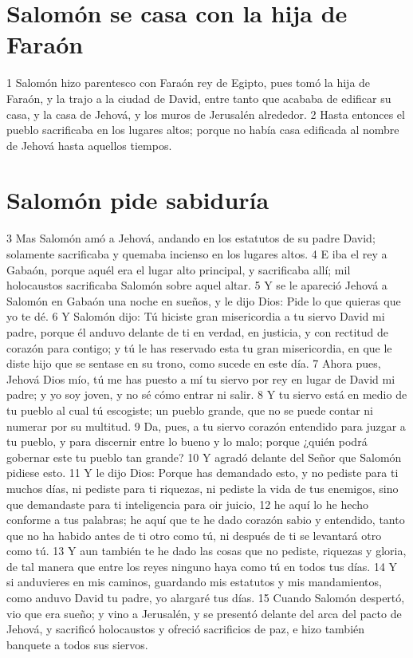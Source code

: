 \section*{Salomón se casa con la hija de Faraón}


1 Salomón hizo parentesco con Faraón rey de Egipto, pues tomó la hija de Faraón, y la trajo a la ciudad de David, entre tanto que acababa de edificar su casa, y la casa de Jehová, y los muros de Jerusalén alrededor.
2 Hasta entonces el pueblo sacrificaba en los lugares altos; porque no había casa edificada al nombre de Jehová hasta aquellos tiempos.
\section*{Salomón pide sabiduría}

 
3 Mas Salomón amó a Jehová, andando en los estatutos de su padre David; solamente sacrificaba y quemaba incienso en los lugares altos.
4 E iba el rey a Gabaón, porque aquél era el lugar alto principal, y sacrificaba allí; mil holocaustos sacrificaba Salomón sobre aquel altar.
5 Y se le apareció Jehová a Salomón en Gabaón una noche en sueños, y le dijo Dios: Pide lo que quieras que yo te dé.
6 Y Salomón dijo: Tú hiciste gran misericordia a tu siervo David mi padre, porque él anduvo delante de ti en verdad, en justicia, y con rectitud de corazón para contigo; y tú le has reservado esta tu gran misericordia, en que le diste hijo que se sentase en su trono, como sucede en este día.
7 Ahora pues, Jehová Dios mío, tú me has puesto a mí tu siervo por rey en lugar de David mi padre; y yo soy joven, y no sé cómo entrar ni salir.
8 Y tu siervo está en medio de tu pueblo al cual tú escogiste; un pueblo grande, que no se puede contar ni numerar por su multitud.
9 Da, pues, a tu siervo corazón entendido para juzgar a tu pueblo, y para discernir entre lo bueno y lo malo; porque ¿quién podrá gobernar este tu pueblo tan grande?
10 Y agradó delante del Señor que Salomón pidiese esto.
11 Y le dijo Dios: Porque has demandado esto, y no pediste para ti muchos días, ni pediste para ti riquezas, ni pediste la vida de tus enemigos, sino que demandaste para ti inteligencia para oir juicio,
12 he aquí lo he hecho conforme a tus palabras; he aquí que te he dado corazón sabio y entendido, tanto que no ha habido antes de ti otro como tú, ni después de ti se levantará otro como tú.
13 Y aun también te he dado las cosas que no pediste, riquezas y gloria, de tal manera que entre los reyes ninguno haya como tú en todos tus días.
14 Y si anduvieres en mis caminos, guardando mis estatutos y mis mandamientos, como anduvo David tu padre, yo alargaré tus días.
15 Cuando Salomón despertó, vio que era sueño; y vino a Jerusalén, y se presentó delante del arca del pacto de Jehová, y sacrificó holocaustos y ofreció sacrificios de paz, e hizo también banquete a todos sus siervos.
